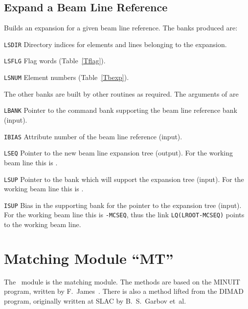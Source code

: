 \section{Expand a Beam Line Reference}
\label{LNREFE}
Builds an expansion for a given beam line reference.
The banks produced are:
\begin{mylist}
\item[\tt LSDIR]
Directory indices for elements and lines belonging to the expansion.
\item[\tt LSFLG]
Flag words (Table~\ref{Tflag}).
\item[\tt LSNUM]
Element numbers (Table~\ref{Tbexp}).
\end{mylist}
The other banks are built by other routines as required.
The arguments of  are
\begin{mylist}
\item[\tt LBANK]
Pointer to the command bank supporting the beam line reference bank
(input).
\item[\tt IBIAS]
Attribute number of the beam line reference (input).
\item[\tt LSEQ]
Pointer to the new beam line expansion tree (output).
For the working beam line this is .
\item[\tt LSUP]
Pointer to the bank which will support the expansion tree (input).
For the working beam line this is .
\item[\tt ISUP]
Bias in the supporting bank for the pointer to the expansion tree
(input).
For the working beam line this is {\tt -MCSEQ},
thus the link {\tt LQ(LROOT-MCSEQ)} points to the working beam line.
\end{mylist}



\chapter{Matching Module ``MT''}
\label{MT}
The ~module is the matching module.
The methods are based on the MINUIT program,
written by F.~James~\cite{JAMES}.
There is also a method  lifted from the DIMAD program,
originally written at SLAC by B.~S.~Garbov et~al.


